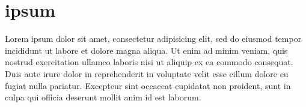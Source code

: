 \section{ipsum}

Lorem ipsum dolor sit amet, consectetur adipisicing elit, sed do eiusmod
tempor incididunt ut labore et dolore magna aliqua. Ut enim ad minim veniam,
quis nostrud exercitation ullamco laboris nisi ut aliquip ex ea commodo
consequat. Duis aute irure dolor in reprehenderit in voluptate velit esse
cillum dolore eu fugiat nulla pariatur. Excepteur sint occaecat cupidatat non
proident, sunt in culpa qui officia deserunt mollit anim id est laborum.
